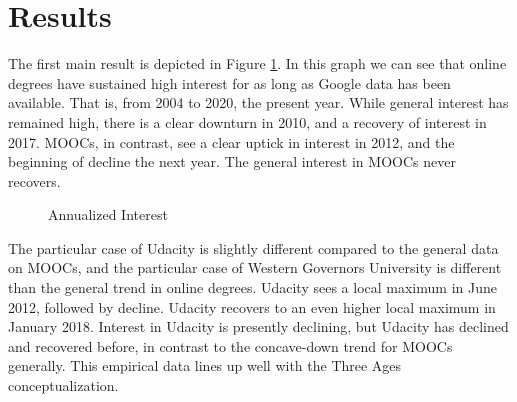 \documentclass[review]{elsarticle}
\begin{document}
\section{Results}

The first main result is depicted in Figure \ref{fig:google_trends_digital_education}.
In this graph we can see that online degrees have sustained high interest for as long as Google data has been available.
That is, from 2004 to 2020, the present year.
While general interest has remained high, there is a clear downturn in 2010, and a recovery of interest in 2017.
MOOCs, in contrast, see a clear uptick in interest in 2012, and the beginning of decline the next year.
The general interest in MOOCs never recovers.

\begin{figure}[h!]
    \centering
    \caption{Annualized Interest}


    \label{fig:google_trends_digital_education}
\end{figure}

The particular case of Udacity is slightly different compared to the general data on MOOCs,
and the particular case of Western Governors University is different than the general trend in online degrees.
Udacity sees a local maximum in June 2012, followed by decline.
Udacity recovers to an even higher local maximum in January 2018.
Interest in Udacity is presently declining, but Udacity has declined and recovered before,
in contrast to the concave-down trend for MOOCs generally.
This empirical data lines up well with the Three Ages conceptualization.
\end{document}
